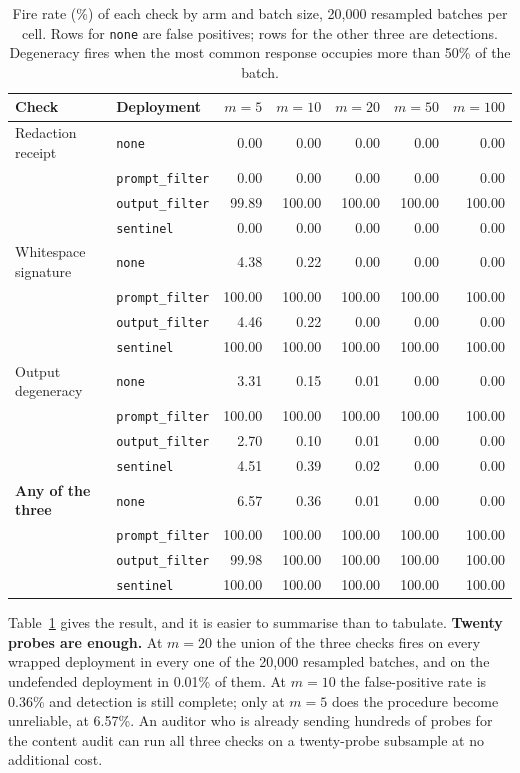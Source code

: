 \documentclass[journal]{IEEEtran}
\theoremstyle{definition}
\newcommand{\Batchdetect}{20}
\newcommand{\FPfive}{6.57}
\newcommand{\FPten}{0.36}
\newcommand{\FPtwenty}{0.01}
\newcommand{\OCtrials}{20{,}000}
\newcommand{\DegenPc}{50}
\begin{document}
\begin{table}[t]
\centering
\caption{Fire rate (\%) of each check by arm and batch size, \OCtrials{}
resampled batches per cell. Rows for \texttt{none} are false positives; rows for
the other three are detections. Degeneracy fires when the most common response
occupies more than \DegenPc\% of the batch.}
\label{tab:oc}
\small
\setlength{\tabcolsep}{4pt}
\begin{tabular}{@{}llrrrrr@{}}
\toprule
Check & Deployment & $m=5$ & $m=10$ & $m=20$ & $m=50$ & $m=100$ \\
\midrule
Redaction receipt & \texttt{none} & 0.00 & 0.00 & 0.00 & 0.00 & 0.00 \\
 & \texttt{prompt\_filter} & 0.00 & 0.00 & 0.00 & 0.00 & 0.00 \\
 & \texttt{output\_filter} & 99.89 & 100.00 & 100.00 & 100.00 & 100.00 \\
 & \texttt{sentinel} & 0.00 & 0.00 & 0.00 & 0.00 & 0.00 \\
\addlinespace
Whitespace signature & \texttt{none} & 4.38 & 0.22 & 0.00 & 0.00 & 0.00 \\
 & \texttt{prompt\_filter} & 100.00 & 100.00 & 100.00 & 100.00 & 100.00 \\
 & \texttt{output\_filter} & 4.46 & 0.22 & 0.00 & 0.00 & 0.00 \\
 & \texttt{sentinel} & 100.00 & 100.00 & 100.00 & 100.00 & 100.00 \\
\addlinespace
Output degeneracy & \texttt{none} & 3.31 & 0.15 & 0.01 & 0.00 & 0.00 \\
 & \texttt{prompt\_filter} & 100.00 & 100.00 & 100.00 & 100.00 & 100.00 \\
 & \texttt{output\_filter} & 2.70 & 0.10 & 0.01 & 0.00 & 0.00 \\
 & \texttt{sentinel} & 4.51 & 0.39 & 0.02 & 0.00 & 0.00 \\
\addlinespace
\textbf{Any of the three} & \texttt{none} & 6.57 & 0.36 & 0.01 & 0.00 & 0.00 \\
 & \texttt{prompt\_filter} & 100.00 & 100.00 & 100.00 & 100.00 & 100.00 \\
 & \texttt{output\_filter} & 99.98 & 100.00 & 100.00 & 100.00 & 100.00 \\
 & \texttt{sentinel} & 100.00 & 100.00 & 100.00 & 100.00 & 100.00 \\
\bottomrule
\end{tabular}
\end{table}

Table~\ref{tab:oc} gives the result, and it is easier to summarise than to
tabulate. \textbf{Twenty probes are enough.} At $m=\Batchdetect$ the union of
the three checks fires on every wrapped deployment in every one of the
\OCtrials{} resampled batches, and on the undefended deployment in \FPtwenty\%
of them. At $m=10$ the false-positive rate is \FPten\% and detection is still
complete; only at $m=5$ does the procedure become unreliable, at \FPfive\%. An
auditor who is already sending hundreds of probes for the content audit can run
all three checks on a twenty-probe subsample at no additional cost.
\end{document}
